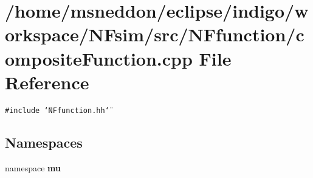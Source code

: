 \section{/home/msneddon/eclipse/indigo/workspace/NFsim/src/NFfunction/compositeFunction.cpp File Reference}
\label{compositeFunction_8cpp}


{\tt \#include \char`\"{}NFfunction.hh\char`\"{}}\par
\subsection*{Namespaces}
\begin{CompactItemize}
\item 
namespace {\bf mu}
\end{CompactItemize}
